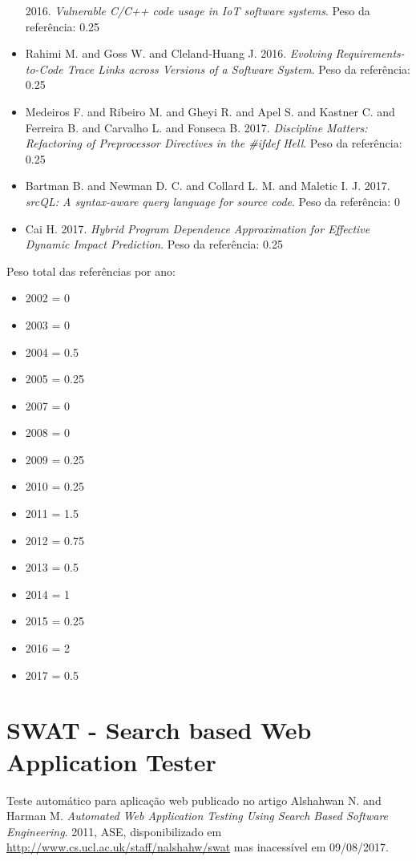 \begin{itemize}
      2016.
      {\it Vulnerable C/C++ code usage in IoT software systems}.
      Peso da referência: 0.25
\item Rahimi M. and Goss W. and Cleland-Huang J.
      2016.
      {\it Evolving Requirements-to-Code Trace Links across Versions of a Software System}.
      Peso da referência: 0.25
\item Medeiros F. and Ribeiro M. and Gheyi R. and Apel S. and Kastner C. and Ferreira B. and Carvalho L. and Fonseca B.
      2017.
      {\it Discipline Matters: Refactoring of Preprocessor Directives in the \#ifdef Hell}.
      Peso da referência: 0.25
\item Bartman B. and Newman D. C. and Collard L. M. and Maletic I. J.
      2017.
      {\it srcQL: A syntax-aware query language for source code}.
      Peso da referência: 0
\item Cai H.
      2017.
      {\it Hybrid Program Dependence Approximation for Effective Dynamic Impact Prediction}.
      Peso da referência: 0.25
\end{itemize}

Peso total das referências por ano:

\begin{itemize}
\item 2002 = 0
\item 2003 = 0
\item 2004 = 0.5
\item 2005 = 0.25
\item 2007 = 0
\item 2008 = 0
\item 2009 = 0.25
\item 2010 = 0.25
\item 2011 = 1.5
\item 2012 = 0.75
\item 2013 = 0.5
\item 2014 = 1
\item 2015 = 0.25
\item 2016 = 2
\item 2017 = 0.5
\end{itemize}


\section{SWAT - Search based Web Application Tester}

Teste automático para aplicação web
publicado no artigo
Alshahwan N. and Harman M.
{\it Automated Web Application Testing Using Search Based Software Engineering}.
2011,
ASE,
disponibilizado em \url{http://www.cs.ucl.ac.uk/staff/nalshahw/swat}
mas inacessível em 09/08/2017.

